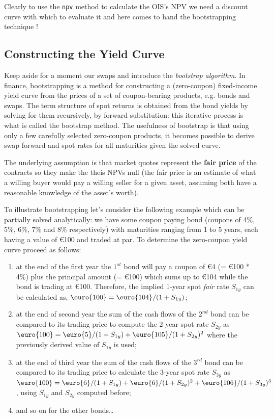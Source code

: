 Clearly to use the \texttt{npv} method to calculate the OIS's NPV we need a discount curve with which to evaluate it and here comes to hand the bootstrapping technique !

\subsection{Constructing the Yield Curve}\label{the-bootstrapping-technique}

Keep aside for a moment our swaps and introduce the \emph{bootstrap
algorithm}. In finance, bootstrapping is a method for constructing a
(zero-coupon) fixed-income yield curve from the prices of a set of
coupon-bearing products, e.g. bonds and swaps. The term structure of
spot returns is obtained from the bond yields by solving for them
recursively, by forward substitution: this iterative process is what is
called the bootstrap method. The usefulness of bootstrap is that using
only a few carefully selected zero-coupon products, it becomes possible
to derive swap forward and spot rates for all maturities given the
solved curve.

The underlying assumption is that market quotes represent the \textbf{fair price} of 
the contracts so they make the theis NPVs null (the fair price is an estimate of what 
a willing buyer would pay a willing seller for a given asset, assuming both have 
a reasonable knowledge of the asset's worth).

To illustrate bootstrapping let's consider the following example which can be partially solved analytically: we have some coupon paying bond (coupons of 4\%, 5\%, 6\%, 7\% and 8\% respectively) with maturities ranging from 1 to 5 years, each having a value of \euro{100} and traded at par. To determine the zero-coupon yield curve proceed as follows:
\begin{enumerate}
\item at the end of the first year the $1^{st}$ bond will pay a coupon of \euro{4} (= \euro{100} * 4\%) plus the principal amount (= \euro{100}) which sums up to \euro{104} while the bond is trading at \euro{100}. Therefore, the implied 1-year spot \emph{fair} rate $S_{1y}$ can be calculated as, $\mbox{\euro{100}} = \mbox{\euro{104}} / (1 + S_{1y})$;

\item at the end of second year the sum of the cash flows of the $2^{nd}$ bond can be compared to its trading price to compute the 2-year spot rate $S_{2y}$ as $\mbox{\euro{100}} = \mbox{\euro{5}} / (1 + S_{1y}) + \mbox{\euro{105}} / (1 + S_{2y})^{2}$ where the previously derived value of $S_{1y}$ is used;

\item at the end of third year the sum of the cash flows of the $3^{rd}$ bond can be compared to its trading price to calculate the 3-year spot rate $S_{3y}$ as $\mbox{\euro{100}} = \mbox{\euro{6}} / (1 + S_{1y}) + \mbox{\euro{6}} / (1 + S_{2y})^{2} + \mbox{\euro{106}} / (1 + S_{3y})^{3}$, using $S_{1y}$ and $S_{2y}$ computed before;

\item and so on for the other bonds\ldots
\end{enumerate}

